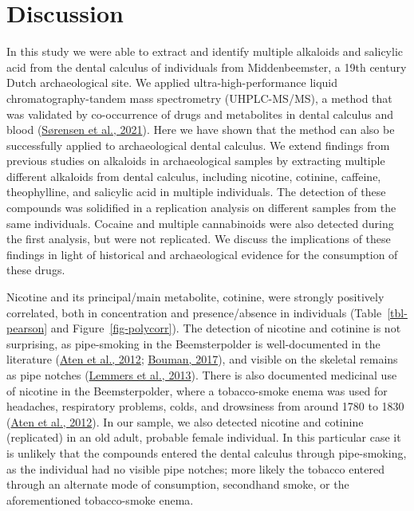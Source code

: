 \documentclass[
  b5paper,
]{book}
\begin{document}
\hypertarget{discussion-2}{%
\section{Discussion}\label{discussion-2}}

In this study we were able to extract and identify multiple alkaloids
and salicylic acid from the dental calculus of individuals from
Middenbeemster, a 19th century Dutch archaeological site. We applied
ultra-high-performance liquid chromatography-tandem mass spectrometry
(UHPLC-MS/MS), a method that was validated by co-occurrence of drugs and
metabolites in dental calculus and blood
(\protect\hyperlink{ref-sorensenDrugsCalculus2021}{Sørensen et al.,
2021}). Here we have shown that the method can also be successfully
applied to archaeological dental calculus. We extend findings from
previous studies on alkaloids in archaeological samples by extracting
multiple different alkaloids from dental calculus, including nicotine,
cotinine, caffeine, theophylline, and salicylic acid in multiple
individuals. The detection of these compounds was solidified in a
replication analysis on different samples from the same individuals.
Cocaine and multiple cannabinoids were also detected during the first
analysis, but were not replicated. We discuss the implications of these
findings in light of historical and archaeological evidence for the
consumption of these drugs.

Nicotine and its principal/main metabolite, cotinine, were strongly
positively correlated, both in concentration and presence/absence in
individuals (Table~\ref{tbl-pearson} and Figure~\ref{fig-polycorr}). The
detection of nicotine and cotinine is not surprising, as pipe-smoking in
the Beemsterpolder is well-documented in the literature
(\protect\hyperlink{ref-aten400Jaar2012}{Aten et al., 2012};
\protect\hyperlink{ref-boumanBegravenis2017}{Bouman, 2017}), and visible
on the skeletal remains as pipe notches
(\protect\hyperlink{ref-lemmersMiddenbeemster2013}{Lemmers et al.,
2013}). There is also documented medicinal use of nicotine in the
Beemsterpolder, where a tobacco-smoke enema was used for headaches,
respiratory problems, colds, and drowsiness from around 1780 to 1830
(\protect\hyperlink{ref-aten400Jaar2012}{Aten et al., 2012}). In our
sample, we also detected nicotine and cotinine (replicated) in an old
adult, probable female individual. In this particular case it is
unlikely that the compounds entered the dental calculus through
pipe-smoking, as the individual had no visible pipe notches; more likely
the tobacco entered through an alternate mode of consumption, secondhand
smoke, or the aforementioned tobacco-smoke enema.
\end{document}
